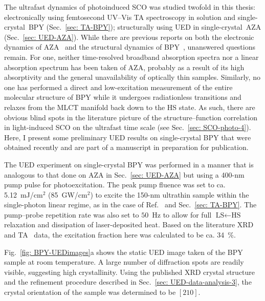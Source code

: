 The ultrafast dynamics of photoinduced SCO was studied twofold in this thesis:
electronically using femtosecond UV--Vis TA spectroscopy in solution and single-crystal~BPY
(Sec.~\ref{sec: TA-BPY}); structurally using UED in single-crystal~AZA (Sec.~\ref{sec: UED-AZA}).
%
While there are previous reports on both the electronic dynamics of AZA~\cite{Marino2013, Marino2016}
and the structural dynamics of BPY~\cite{Gawelda2007b, Bressler2009, Haldrup2012, Freyer2013,
Haldrup2016, Lemke2017, Kjaer2017a}, unanswered questions remain.
%
For one, neither time-resolved broadband absorption spectra
nor a linear absorption spectrum has been taken of AZA,
probably as a result of its high absorptivity and
the general unavailability of optically thin samples.
%
Similarly, no one has performed a direct and low-excitation measurement
of the entire molecular structure of BPY while it undergoes radiationless transitions
and relaxes from the MLCT manifold back down to the HS state.
%
As such, there are obvious blind spots in the literature picture
of the structure--function correlation in light-induced SCO on the ultrafast time scale
(see Sec.~\ref{sec: SCO-photo-4}).
%
Here, I present some preliminary UED results on single-crystal BPY
that were obtained recently and are part of a manuscript in preparation for publication.

The UED experiment on single-crystal BPY was performed in a manner
that is analogous to that done on AZA in Sec.~\ref{sec: UED-AZA}
but using a 400-nm pump pulse for photoexcitation.
%
The peak pump fluence was set to ca. 5.12~mJ/cm$^2$ (85~GW/cm$^2$)
to excite the 150-nm ultrathin sample within the single-photon linear regime,
as in the case of Ref.~\cite{Aubock2015} and Sec.~\ref{sec: TA-BPY}.
The pump--probe repetition rate was also set to $50$~Hz to allow for
full $\text{LS} \leftarrow \text{HS}$ relaxation and dissipation of laser-deposited heat.
%
Based on the literature XRD~\cite{Dick1998} and TA~\cite{Zhang2014, Field2016} data,
the excitation fraction here was calculated to be ca. 34~\%.

Fig.~\ref{fig: BPY-UEDimages}a shows the static UED image taken
of the BPY sample at room temperature.
A large number of diffraction spots are readily visible,
suggesting high crystallinity.
Using the published XRD crystal structure and the refinement procedure
described in Sec.~\ref{sec: UED-data-analysis-3},
the crystal orientation of the sample was determined to be $[2 1 0]$.

